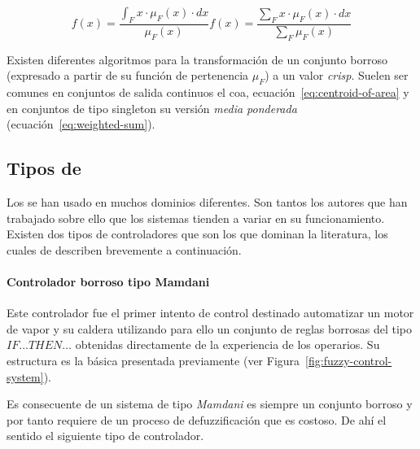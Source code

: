 \begin{subequations}
	\begin{equation}
		f(x) = \frac{\int_{F} x \cdot \mu_F(x) \cdot dx}{\mu_F(x)}
		\label{eq:centroid-of-area}
	\end{equation}
	\begin{equation}
		f(x) = \frac{\sum_{F} x \cdot \mu_F(x) \cdot dx}{\sum_{F} \mu_F(x)}
		\label{eq:weighted-sum}
	\end{equation}
\end{subequations}

Existen diferentes algoritmos para la transformación de un conjunto borroso (expresado a partir de su función de pertenencia $\mu_F$) a un valor \textit{crisp}. Suelen ser comunes en conjuntos de salida continuos el \Acrfull{coa}, ecuación~\ref{eq:centroid-of-area} y en conjuntos de tipo singleton su versión \textit{media ponderada} (ecuación~\ref{eq:weighted-sum}).

\subsection{Tipos de }

Los  se han usado en muchos dominios diferentes. Son tantos los autores que han trabajado sobre ello que los sistemas tienden a variar en su funcionamiento. Existen dos tipos de controladores que son los que dominan la literatura, los cuales de describen brevemente a continuación.

\paragraph{Controlador borroso tipo Mamdani}

Este controlador fue el primer intento de control destinado automatizar un motor de vapor y su caldera utilizando para ello un conjunto de reglas borrosas del tipo \texttt{$IF \ldots THEN \ldots$} obtenidas directamente de la experiencia de los operarios. Su estructura es la básica presentada previamente (ver Figura~\ref{fig:fuzzy-control-system}).

Es consecuente de un sistema de tipo \textit{Mamdani} es siempre un conjunto borroso y por tanto requiere de un proceso de defuzzificación que es costoso. De ahí el sentido el siguiente tipo de controlador.

